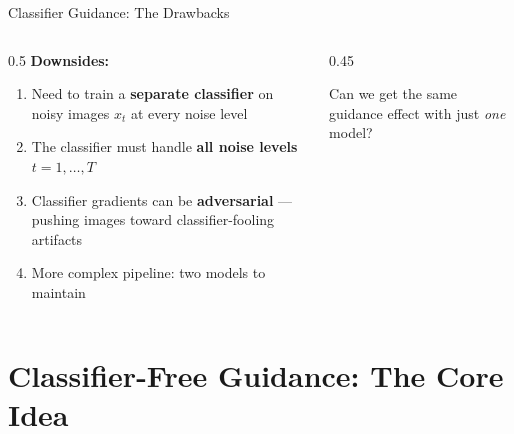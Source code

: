 \documentclass[aspectratio=169, 11pt]{beamer}
\begin{document}
\begin{frame}{Classifier Guidance: The Drawbacks}

\begin{columns}
\begin{column}{0.5\textwidth}
\textbf{Downsides:}
\begin{enumerate}
    \item Need to train a \textbf{separate classifier} on noisy images $x_t$ at every noise level
    \item The classifier must handle \textbf{all noise levels} $t = 1, \ldots, T$
    \item Classifier gradients can be \textbf{adversarial} --- pushing images toward classifier-fooling artifacts
    \item More complex pipeline: two models to maintain
\end{enumerate}
\end{column}

\begin{column}{0.45\textwidth}
\centering
{}

\bigskip
\alert{Can we get the same guidance effect with just \emph{one} model?}
\end{column}
\end{columns}

\end{frame}

\section{Classifier-Free Guidance: The Core Idea}
\end{document}
